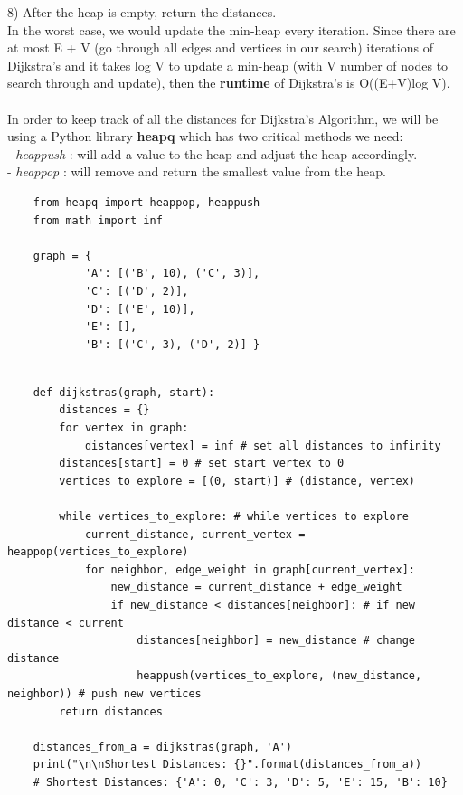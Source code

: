 \documentclass[11pt, a4paper]{article}
\begin{document}
\begin{spacing}{1.1}
	\hspace*{3mm} 8) After the heap is empty, return the distances. \vspace*{2mm} \\
	In the worst case, we would update the min-heap every iteration. Since there are at most E + V (go through all edges and vertices in our search) iterations of Dijkstra’s and it takes log V to update a min-heap (with V number of nodes to search through and update), then the \textbf{runtime} of Dijkstra’s is O((E+V)log V). \\~\\
	In order to keep track of all the distances for Dijkstra’s Algorithm, we will be using a Python library \textbf{heapq} which has two critical methods we need: \\
	\hspace*{3mm} - \textit{heappush} : will add a value to the heap and adjust the heap accordingly. \\
	\hspace*{3mm} - \textit{heappop} : will remove and return the smallest value from the heap. 
	\begin{lstlisting}
	from heapq import heappop, heappush
	from math import inf
	
	graph = {
			'A': [('B', 10), ('C', 3)],
			'C': [('D', 2)],
			'D': [('E', 10)],
			'E': [],
			'B': [('C', 3), ('D', 2)] }	\end{lstlisting} \newpage

	\begin{lstlisting}
	
	def dijkstras(graph, start):
		distances = {}
		for vertex in graph:
			distances[vertex] = inf # set all distances to infinity
		distances[start] = 0 # set start vertex to 0
		vertices_to_explore = [(0, start)] # (distance, vertex)
		
		while vertices_to_explore: # while vertices to explore
			current_distance, current_vertex = heappop(vertices_to_explore)
			for neighbor, edge_weight in graph[current_vertex]:
				new_distance = current_distance + edge_weight 
				if new_distance < distances[neighbor]: # if new distance < current
					distances[neighbor] = new_distance # change distance
					heappush(vertices_to_explore, (new_distance, neighbor)) # push new vertices    
		return distances
	
	distances_from_a = dijkstras(graph, 'A')
	print("\n\nShortest Distances: {}".format(distances_from_a))
	# Shortest Distances: {'A': 0, 'C': 3, 'D': 5, 'E': 15, 'B': 10} \end{lstlisting} \vspace*{2mm}
	

\end{spacing}
\end{document}
